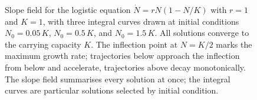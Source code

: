 \begin{figure}[htbp]
\begin{tikzpicture}
\end{tikzpicture}
\caption[Slope field for the logistic equation]{Slope field for the
logistic equation $\dot{N}=rN(1-N/K)$ with $r=1$ and $K=1$, with
three integral curves drawn at initial conditions $N_{0}=0.05\,K$,
$N_{0}=0.5\,K$, and $N_{0}=1.5\,K$. All solutions converge to the
carrying capacity $K$. The inflection point at $N=K/2$ marks the
maximum growth rate; trajectories below approach the inflection
from below and accelerate, trajectories above decay monotonically.
The slope field summarises every solution at once; the integral
curves are particular solutions selected by initial condition.}
\label{fig:vol02:ch07:slope-field}
\end{figure}

